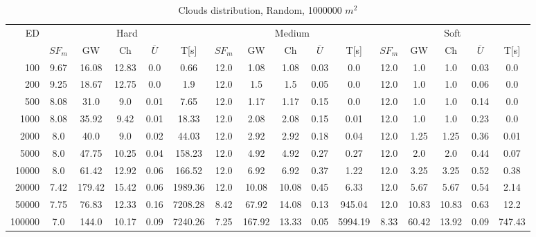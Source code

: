 \begin{table}[htb]
	\centering
	\footnotesize
	\begin{tabular}{|r|c|c|c|c|c|c|c|c|c|c|c|c|c|c|c|} 
		\hline
		\multirow{2}{*}{ED} & \multicolumn{5}{c|}{Hard} & \multicolumn{5}{c|}{Medium} &\multicolumn{5}{c|}{Soft} \\ 
		\cline{2-16} 
		&$SF_{m}$&GW & Ch & $\overline{U}$&T[s] &$SF_{m}$&GW & Ch & $\overline{U}$ &T[s] &$SF_{m}$&GW & Ch & $\overline{U}$  & T[s]  \\ 
		\hline 
		100 & 9.67 & 16.08 & 12.83 & 0.0 & 0.66 & 12.0 & 1.08 & 1.08 & 0.03 & 0.0 & 12.0 & 1.0 & 1.0 & 0.03 & 0.0\\ 
		200 & 9.25 & 18.67 & 12.75 & 0.0 & 1.9 & 12.0 & 1.5 & 1.5 & 0.05 & 0.0 & 12.0 & 1.0 & 1.0 & 0.06 & 0.0\\ 
		500 & 8.08 & 31.0 & 9.0 & 0.01 & 7.65 & 12.0 & 1.17 & 1.17 & 0.15 & 0.0 & 12.0 & 1.0 & 1.0 & 0.14 & 0.0\\ 
		1000 & 8.08 & 35.92 & 9.42 & 0.01 & 18.33 & 12.0 & 2.08 & 2.08 & 0.15 & 0.01 & 12.0 & 1.0 & 1.0 & 0.23 & 0.0\\ 
		2000 & 8.0 & 40.0 & 9.0 & 0.02 & 44.03 & 12.0 & 2.92 & 2.92 & 0.18 & 0.04 & 12.0 & 1.25 & 1.25 & 0.36 & 0.01\\ 
		5000 & 8.0 & 47.75 & 10.25 & 0.04 & 158.23 & 12.0 & 4.92 & 4.92 & 0.27 & 0.27 & 12.0 & 2.0 & 2.0 & 0.44 & 0.07\\ 
		10000 & 8.0 & 61.42 & 12.92 & 0.06 & 166.52 & 12.0 & 6.92 & 6.92 & 0.37 & 1.22 & 12.0 & 3.25 & 3.25 & 0.52 & 0.38\\ 
		20000 & 7.42 & 179.42 & 15.42 & 0.06 & 1989.36 & 12.0 & 10.08 & 10.08 & 0.45 & 6.33 & 12.0 & 5.67 & 5.67 & 0.54 & 2.14\\ 
		50000 & 7.75 & 76.83 & 12.33 & 0.16 & 7208.28 & 8.42 & 67.92 & 14.08 & 0.13 & 945.04 & 12.0 & 10.83 & 10.83 & 0.63 & 12.2\\ 
		100000 & 7.0 & 144.0 & 10.17 & 0.09 & 7240.26 & 7.25 & 167.92 & 13.33 & 0.05 & 5994.19 & 8.33 & 60.42 & 13.92 & 0.09 & 747.43\\ 
		\hline 
	\end{tabular} 
	\caption{Clouds distribution, Random, 1000000 $m^2$} 
	\label{tab:UnRandom1000} 
\end{table} 
